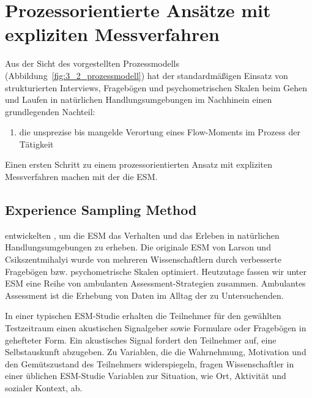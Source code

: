 





\section{Prozessorientierte Ansätze mit expliziten Messverfahren} %
\label{sec:prozessorientierte_ansatze_mit_expliziten_messverfahren}

Aus der Sicht des vorgestellten Prozessmodells (Abbildung~\ref{fig:3_2_prozessmodell}) hat der standardmäßigen Einsatz von strukturierten Interviews, Fragebögen und psychometrischen Skalen beim Gehen und Laufen in natürlichen Handlungsumgebungen im Nachhinein einen grundlegenden Nachteil:

\begin{enumerate}
	\item die unsprezise bis mangelde Verortung eines Flow-Moments im Prozess der Tätigkeit 
\end{enumerate}

Einen ersten Schritt zu einem prozessorientierten Ansatz mit expliziten Messverfahren machen \citep{Larson1983} mit der die \ac{ESM}.

\subsection{Experience Sampling Method} %
\label{sub:experience_sampling_method}

\citep{Larson1983} entwickelten \citep{Larson1983}, um die \ac{ESM} das Verhalten und das Erleben in natürlichen Handlungsumgebungen zu erheben. Die originale \ac{ESM} von Larson und Csikszentmihalyi wurde von mehreren Wissenschaftlern \citep[z.~B. ][]{Schallberger2001, Rheinberg2003} durch verbesserte Fragebögen bzw. psychometrische Skalen optimiert. Heutzutage fassen wir unter \ac{ESM} eine Reihe von ambulanten Assessment-Strategien zusammen. Ambulantes Assessment ist die Erhebung von Daten im Alltag der zu Untersuchenden.

In einer typischen \ac{ESM}-Studie erhalten die Teilnehmer für den gewählten Testzeitraum einen akustischen Signalgeber sowie Formulare oder Fragebögen in gehefteter Form. Ein akustisches Signal fordert den Teilnehmer auf, eine Selbstauskunft abzugeben. Zu Variablen, die die Wahrnehmung, Motivation und den Gemütszustand des Teilnehmers widerspiegeln, fragen Wissenschaftler in einer üblichen \ac{ESM}-Studie Variablen zur Situation, wie Ort, Aktivität und sozialer Kontext, ab. 

